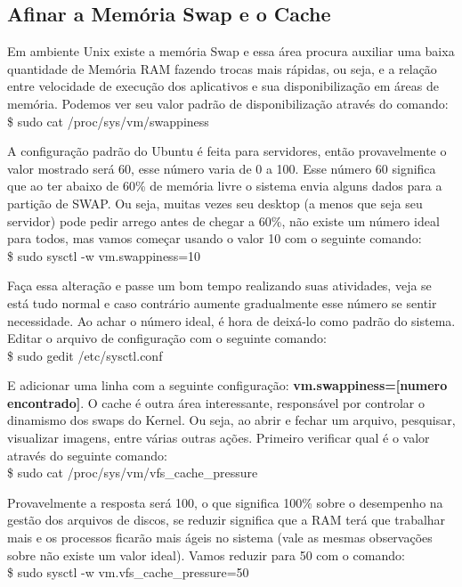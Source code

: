 \subsection{Afinar a Memória Swap e o Cache}
Em ambiente Unix existe a memória Swap e essa área procura auxiliar uma baixa quantidade de Memória RAM fazendo trocas mais rápidas, ou seja, e a relação entre velocidade de execução dos aplicativos e sua disponibilização em áreas de memória. Podemos ver seu valor padrão de disponibilização através do comando: \\
{\ttfamily\$ sudo cat /proc/sys/vm/swappiness}

A configuração padrão do Ubuntu é feita para servidores, então provavelmente o valor mostrado será 60, esse número varia de 0 a 100. Esse número 60 significa que ao ter abaixo de 60\% de memória livre o sistema envia alguns dados para a partição de SWAP. Ou seja, muitas vezes seu desktop (a menos que seja seu servidor) pode pedir arrego antes de chegar a 60\%, não existe um número ideal para todos, mas vamos começar usando o valor 10 com o seguinte comando: \\
{\ttfamily\$ sudo sysctl -w vm.swappiness=10}

Faça essa alteração e passe um bom tempo realizando suas atividades, veja se está tudo normal e caso contrário aumente gradualmente esse número se sentir necessidade. Ao achar o número ideal, é hora de deixá-lo como padrão do sistema. Editar o arquivo de configuração com o seguinte comando: \\
{\ttfamily\$ sudo gedit /etc/sysctl.conf}

E adicionar uma linha com a seguinte configuração: \textbf{vm.swappiness=[numero encontrado]}. O cache é outra área interessante, responsável por controlar o dinamismo dos swaps do Kernel. Ou seja, ao abrir e fechar um arquivo, pesquisar, visualizar imagens, entre várias outras ações. Primeiro verificar qual é o valor através do seguinte comando: \\
{\ttfamily\$ sudo cat /proc/sys/vm/vfs\_cache\_pressure}

Provavelmente a resposta será 100, o que significa 100\% sobre o desempenho na gestão dos arquivos de discos, se reduzir significa que a RAM terá que trabalhar mais e os processos ficarão mais ágeis no sistema (vale as mesmas observações sobre não existe um valor ideal). Vamos reduzir para 50 com o comando: \\
{\ttfamily\$ sudo sysctl -w vm.vfs\_cache\_pressure=50}

